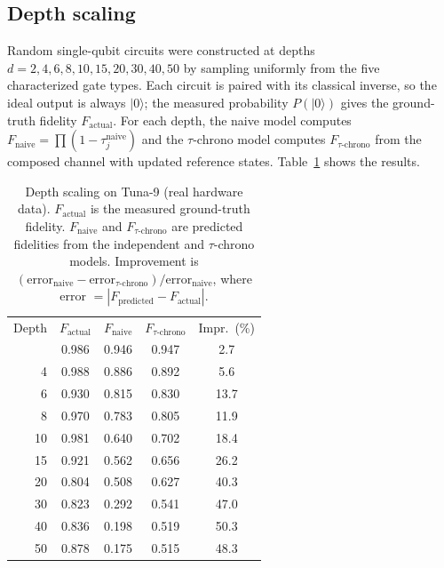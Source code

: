 \documentclass[prl,twocolumn,superscriptaddress,longbibliography]{revtex4-2}
\begin{document}
\subsection{Depth scaling}

Random single-qubit circuits were constructed at depths $d = 2, 4, 6, 8, 10, 15, 20, 30, 40, 50$ by sampling uniformly from the five characterized gate types. Each circuit is paired with its classical inverse, so the ideal output is always $|0\rangle$; the measured probability $P(|0\rangle)$ gives the ground-truth fidelity $F_{\text{actual}}$. For each depth, the naive model computes $F_{\text{naive}} = \prod(1-\tau_j^{\text{naive}})$ and the $\tau$-chrono model computes $F_{\tau\text{-chrono}}$ from the composed channel with updated reference states. Table~\ref{tab:depth} shows the results.

\begin{table}[b]
\caption{\label{tab:depth}Depth scaling on Tuna-9 (real hardware data). $F_{\text{actual}}$ is the measured ground-truth fidelity. $F_{\text{naive}}$ and $F_{\tau\text{-chrono}}$ are predicted fidelities from the independent and $\tau$-chrono models. Improvement is $(\text{error}_{\text{naive}} - \text{error}_{\tau\text{-chrono}})/\text{error}_{\text{naive}}$, where error $= |F_{\text{predicted}} - F_{\text{actual}}|$.}
\begin{ruledtabular}
\begin{tabular}{rcccc}
Depth & $F_{\text{actual}}$ & $F_{\text{naive}}$ & $F_{\tau\text{-chrono}}$ & Impr.\ (\%) \\
\colrule
2  & 0.986 & 0.946 & 0.947 & 2.7 \\
4  & 0.988 & 0.886 & 0.892 & 5.6 \\
6  & 0.930 & 0.815 & 0.830 & 13.7 \\
8  & 0.970 & 0.783 & 0.805 & 11.9 \\
10 & 0.981 & 0.640 & 0.702 & 18.4 \\
15 & 0.921 & 0.562 & 0.656 & 26.2 \\
20 & 0.804 & 0.508 & 0.627 & 40.3 \\
30 & 0.823 & 0.292 & 0.541 & 47.0 \\
40 & 0.836 & 0.198 & 0.519 & 50.3 \\
50 & 0.878 & 0.175 & 0.515 & 48.3 \\
\end{tabular}
\end{ruledtabular}
\end{table}
\end{document}
